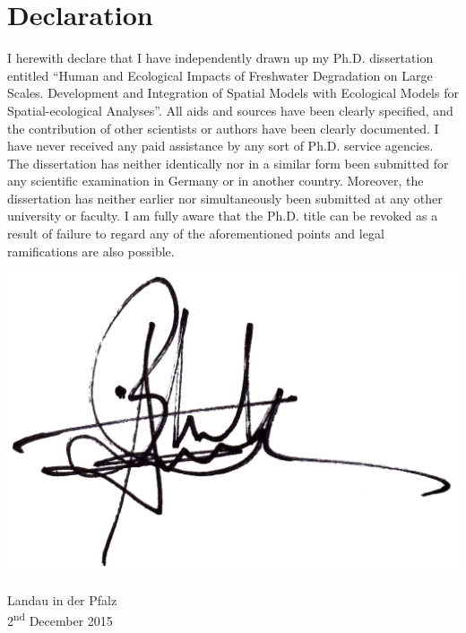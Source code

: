 \chapter{Declaration}
\label{Declaration}


I herewith declare that I have independently drawn up my Ph.D. dissertation entitled ``Human and Ecological Impacts of Freshwater Degradation on Large Scales. Development and Integration of Spatial Models with Ecological Models for Spatial-ecological Analyses''. All aids and sources have been clearly specified, and the contribution of other scientists or authors have been clearly documented. I have never received any paid assistance by any sort of Ph.D. service agencies. The dissertation has neither identically nor in a similar form been submitted for any scientific examination in Germany or in another country. Moreover, the dissertation has neither earlier nor simultaneously been submitted at any other university or faculty. I am fully aware that the Ph.D. title can be revoked as a result of failure to regard any of the aforementioned points and legal ramifications are also possible.

\vspace{3cm}

\begin{flushright}
\includegraphics[width=0.2\linewidth]{Figures/signature.png}\\
\textbf{\textsc{\theauthor}}\\
\vspace{2pt}
Landau in der Pfalz\\
2\textsuperscript{nd} December 2015
\end{flushright}
